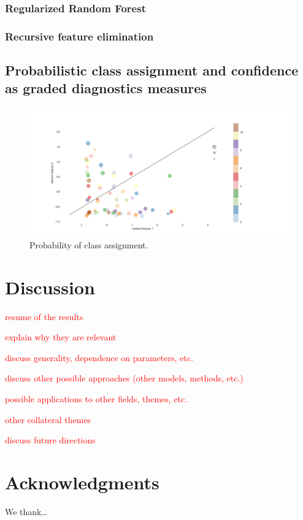 \documentclass[12pt, a4paper, final, fleqn]{article}
\begin{document}
\subsubsection{Regularized Random Forest}
\subsubsection{Recursive feature elimination}

\subsection{Probabilistic class assignment and confidence as graded diagnostics measures}
\begin{figure}[!htb]
\begin{center}
\includegraphics[width=0.89\columnwidth]{proba_samples_two_features}
  \caption[Probability of class assignment]{Probability of class assignment.
	  \label{fig:probabilistic}}
\end{center}
\end{figure}

\section{Discussion}
\label{discussion}

\textcolor{red}{resume of the results}

\textcolor{red}{explain why they are relevant}

\textcolor{red}{discuss generality, dependence on parameters, etc.}

\textcolor{red}{discuss other possible approaches (other models, methods, etc.)}

\textcolor{red}{possible applications to other fields, themes, etc.}

\textcolor{red}{other collateral themes}

\textcolor{red}{discuss future directions}

\section*{Acknowledgments}

We thank\dots 




\clearpage

\end{document}
